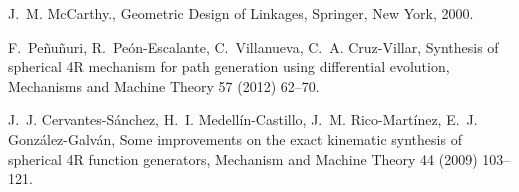 \documentclass[11pt]{article}
\begin{document}
\begin{thebibliography}{10}
J.~M. McCarthy., Geometric Design of Linkages, Springer, New York, 2000.

F.~{Pe\~nu\~nuri}, R.~{Pe\'on-Escalante}, C.~Villanueva, C.~A. Cruz-Villar,
  Synthesis of spherical {4R} mechanism for path generation using differential
  evolution, Mechanisms and Machine Theory 57 (2012) 62--70.

J.~J. {Cervantes-S\'anchez}, H.~I. {Medell\'in-Castillo}, J.~M.
  {Rico-Mart\'inez}, E.~J. {Gonz\'alez-Galv\'an}, Some improvements on the
  exact kinematic synthesis of spherical {4R} function generators, Mechanism
  and Machine Theory 44 (2009) 103--121.

\end{thebibliography}
\end{document}
